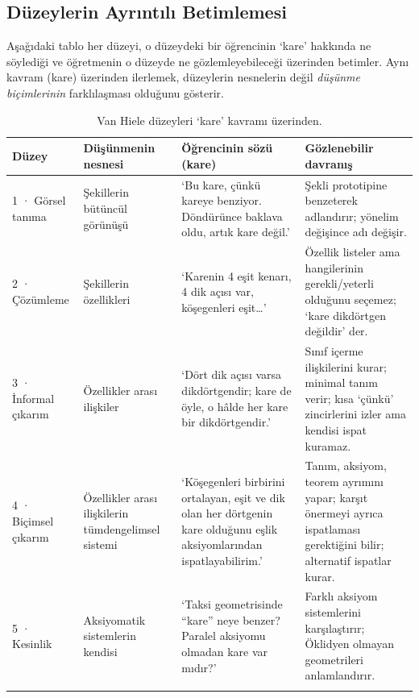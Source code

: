 \subsection{Düzeylerin Ayrıntılı Betimlemesi}

Aşağıdaki tablo her düzeyi, o düzeydeki bir öğrencinin ‘kare’ hakkında ne söylediği ve öğretmenin o düzeyde ne gözlemleyebileceği üzerinden betimler. Aynı kavram (kare) üzerinden ilerlemek, düzeylerin nesnelerin değil \emph{düşünme biçimlerinin} farklılaşması olduğunu gösterir.

\begin{longtable}{>{\raggedright\arraybackslash}p{1.5cm}>{\raggedright\arraybackslash}p{2.2cm}>{\raggedright\arraybackslash}p{3.2cm}>{\raggedright\arraybackslash}p{2.5cm}}
\toprule
\textbf{Düzey} & \textbf{Düşünmenin nesnesi} & \textbf{Öğrencinin sözü (kare)} & \textbf{Gözlenebilir davranış}\\
\midrule\endhead
\small 1 · Görsel tanıma & \small Şekillerin bütüncül görünüşü & \small ‘Bu kare, çünkü kareye benziyor. Döndürünce baklava oldu, artık kare değil.’ & \small Şekli prototipine benzeterek adlandırır; yönelim değişince adı değişir.\\
\small 2 · Çözümleme & \small Şekillerin özellikleri & \small ‘Karenin 4 eşit kenarı, 4 dik açısı var, köşegenleri eşit…’ & \small Özellik listeler ama hangilerinin gerekli/yeterli olduğunu seçemez; ‘kare dikdörtgen değildir’ der.\\
\small 3 · İnformal çıkarım & \small Özellikler arası ilişkiler & \small ‘Dört dik açısı varsa dikdörtgendir; kare de öyle, o hâlde her kare bir dikdörtgendir.’ & \small Sınıf içerme ilişkilerini kurar; minimal tanım verir; kısa ‘çünkü’ zincirlerini izler ama kendisi ispat kuramaz.\\
\small 4 · Biçimsel çıkarım & \small Özellikler arası ilişkilerin tümdengelimsel sistemi & \small ‘Köşegenleri birbirini ortalayan, eşit ve dik olan her dörtgenin kare olduğunu eşlik aksiyomlarından ispatlayabilirim.’ & \small Tanım, aksiyom, teorem ayrımını yapar; karşıt önermeyi ayrıca ispatlaması gerektiğini bilir; alternatif ispatlar kurar.\\
\small 5 · Kesinlik & \small Aksiyomatik sistemlerin kendisi & \small ‘Taksi geometrisinde “kare” neye benzer? Paralel aksiyomu olmadan kare var mıdır?’ & \small Farklı aksiyom sistemlerini karşılaştırır; Öklidyen olmayan geometrileri anlamlandırır.\\
\bottomrule
\caption{Van Hiele düzeyleri ‘kare’ kavramı üzerinden.}
\end{longtable}

